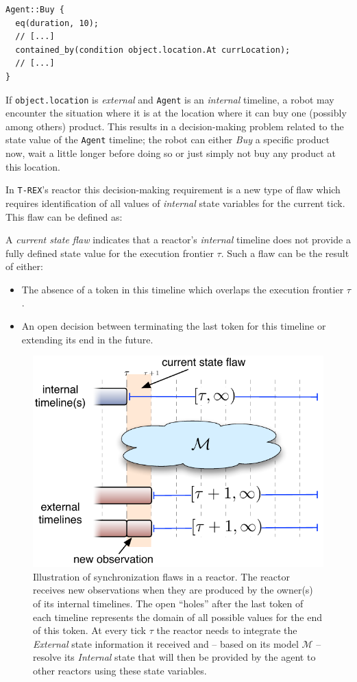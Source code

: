 \begin{verbatim}
Agent::Buy {
  eq(duration, 10);
  // [...]
  contained_by(condition object.location.At currLocation);
  // [...]
}
\end{verbatim}

If \texttt{object.location} is {\em external} and \texttt{Agent} is an
{\em internal} timeline, a robot may encounter the situation where it
is at the location where it can buy one (possibly among others)
product. This results in a decision-making problem related to the
state value of the \texttt{Agent} timeline; the robot can either {\em
  Buy} a specific product now, wait a little longer before doing so or
just simply not buy any product at this location.

In \texttt{T-REX}'s \eu reactor this decision-making requirement is a
new type of flaw which requires identification of all values of {\em
  internal} state variables for the current tick. This flaw can be
defined as:

\begin{definition}
  \label{def:csf}
  A {\em current state flaw} indicates that a reactor's {\em internal}
  timeline does not provide a fully defined state value for the
  execution frontier $\tau$. Such a flaw can be the result of either:

  \begin{itemize}
  \item The absence of a token in this timeline which overlaps the
    execution frontier $\tau$.
  \item An open decision between terminating the last token for this
    timeline or extending its end in the future.
  \end{itemize}

\end{definition} 

\begin{figure}[!htbp]
  \centering
  \includegraphics[width=0.5\columnwidth]{figs/synch-relation}
  \caption{\small Illustration of synchronization flaws in a
    reactor. The reactor receives new observations when they are
    produced by the owner(s) of its internal timelines. The open
    ``holes'' after the last token of each timeline represents the
    domain of all possible values for the end of this token. At every
    tick $\tau$ the reactor needs to integrate the {\em External}
    state information it received and -- based on its model
    $\mathcal{M}$ -- resolve its {\em Internal} state that will then
    be provided by the agent to other reactors using these state
    variables.}
  \label{fig:synch:flaw}
\end{figure}


